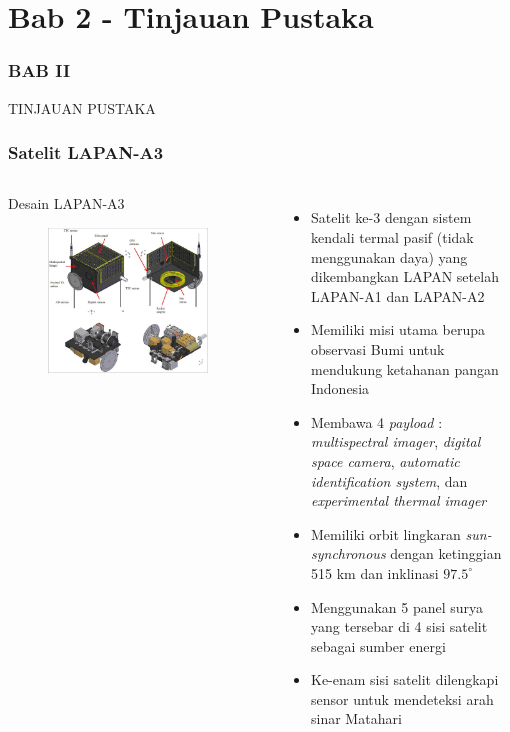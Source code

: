 \documentclass[8pt]{beamer}
\begin{document}
\section{Bab 2 - Tinjauan Pustaka}
\begin{frame}
  \frametitle{BAB II}
  \center \large TINJAUAN PUSTAKA
\end{frame}
\begin{frame}
  \frametitle{Satelit LAPAN-A3}
  \begin{columns}[T]
      \begin{block}{\center Desain LAPAN-A3}
      \begin{figure}
          \includegraphics[width=0.9\textwidth]{figure/a3overview.jpg}
      \end{figure}
      \end{block}
      \begin{itemize}
        \item Satelit ke-3 dengan sistem kendali termal pasif (tidak menggunakan daya) yang dikembangkan LAPAN setelah LAPAN-A1 dan LAPAN-A2
        \item Memiliki misi utama berupa observasi Bumi untuk mendukung ketahanan pangan Indonesia
        \item Membawa 4 \textit{payload} : \textit{multispectral imager}, \textit{digital space camera}, \textit{automatic identification system}, dan \textit{experimental thermal imager} \cite{hartono2019}
        \item Memiliki orbit lingkaran \textit{sun-synchronous} dengan ketinggian 515 km dan inklinasi $97.5^\circ$
        \item Menggunakan 5 panel surya yang tersebar di 4 sisi satelit sebagai sumber energi
        \item Ke-enam sisi satelit dilengkapi sensor untuk mendeteksi arah sinar Matahari
      \end{itemize}
  \end{columns}
\end{frame}
\end{document}
